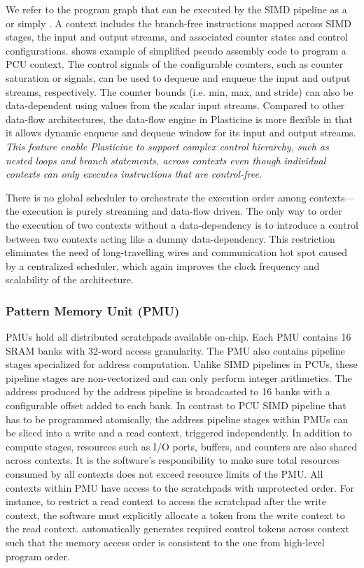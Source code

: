 We refer to the program graph that can be executed by the SIMD pipeline as a  or
simply . 
A context includes the branch-free instructions mapped across SIMD stages, the input and output 
streams, and associated counter states and control configurations.
\todo{} shows example of simplified pseudo assembly code to program a PCU context.
The control signals of the configurable counters, such as counter saturation or 
signals, can be used to dequeue and enqueue the input and output streams, respectively.
The counter bounds (i.e. min, max, and stride) can also be data-dependent using values from the 
scalar input streams. Compared to other data-flow architectures, the data-flow engine in Plasticine 
is more flexible in that it allows dynamic enqueue and dequeue window for its input and output streams.
\emph{This feature enable Plasticine to support complex control hierarchy, such as nested loops and
branch statements, across contexts even though individual contexts can only executes instructions that are
control-free}. 

There is no global scheduler to orchestrate the execution order among contexts---the execution is purely
streaming and data-flow driven. 
The only way to order the execution of two contexts without a data-dependency is to 
introduce a control  between two contexts acting like a dummy data-dependency.
This restriction eliminates the need of long-travelling wires and communication hot spot caused by a
centralized scheduler, which  again improves the clock frequency and scalability of the architecture.

\subsubsection{Pattern Memory Unit (PMU)}
PMUs hold all distributed scratchpads available on-chip. 
Each PMU contains 16 SRAM banks with
32-word access granularity. The PMU also contains pipeline stages specialized for address
computation. Unlike SIMD pipelines in PCUs, these pipeline stages are non-vectorized and can only 
perform integer arithmetics. 
The address produced by the address pipeline is broadcasted to 16 banks with a configurable offset added to each bank.
In contrast to PCU SIMD pipeline that has to be programmed atomically, the address pipeline stages 
within PMUs can be sliced into a write and a read context, triggered independently.
In addition to compute stages, resources such as I/O ports, buffers, and counters are also shared across contexts.
It is the software's responsibility to make sure total resources consumed by all
contexts does not exceed resource limits of the PMU.
All contexts within PMU have access to the scratchpads with unprotected order. For instance, to
restrict a read context to access the scratchpad after the write context, the software must explicitly allocate
a token from the write context to the read context.
\name automatically generates required control tokens across context such that the memory access order is
consistent to the one from high-level program order.

